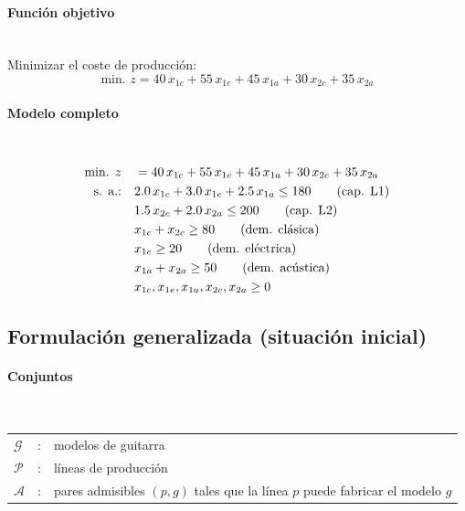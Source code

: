 \paragraph{Función objetivo}\mbox{}\\
Minimizar el coste de producción:
\begin{equation}
\mbox{min. } z = 40\,x_{1c} + 55\,x_{1e} + 45\,x_{1a} + 30\,x_{2c} + 35\,x_{2a}
\end{equation}

\paragraph{Modelo completo}\mbox{}\\
\begin{align}
\mbox{min. } z \quad & = 40\,x_{1c} + 55\,x_{1e} + 45\,x_{1a} + 30\,x_{2c} + 35\,x_{2a} \notag \\
\mbox{s. a.:} \quad
& 2.0\,x_{1c} + 3.0\,x_{1e} + 2.5\,x_{1a} \leq 180 \qquad \text{(cap. L1)} \notag \\
& 1.5\,x_{2c} + 2.0\,x_{2a} \leq 200 \qquad \text{(cap. L2)} \notag \\
& x_{1c} + x_{2c} \geq 80 \qquad \text{(dem. clásica)} \notag \\
& x_{1e} \geq 20 \qquad \text{(dem. eléctrica)} \notag \\
& x_{1a} + x_{2a} \geq 50 \qquad \text{(dem. acústica)} \notag \\
& x_{1c}, x_{1e}, x_{1a}, x_{2c}, x_{2a} \geq 0 \notag
\end{align}

\subsection{Formulación generalizada (situación inicial)}

\paragraph{Conjuntos}\mbox{}\\
\begin{tabular}{l c l}
    $\mathcal{G}$  & : & modelos de guitarra \\
    $\mathcal{P}$  & : & líneas de producción \\
    $\mathcal{A}$  & : & pares admisibles $(p,g)$ tales que la línea $p$ puede fabricar el modelo $g$ \\
\end{tabular}

